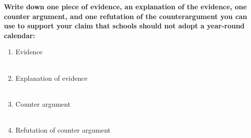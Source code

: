 \documentclass[12pt]{article}
\begin{document}
\begin{tcolorbox}[colframe=black!60, colback=white, 
coltitle=black, colbacktitle=black!15, fonttitle=\bfseries\Large, 
title=Guided Practice, halign title=center, left=10pt, right=10pt, top=10pt, bottom=15pt]
\textbf{Write down one piece of evidence, an explanation of the evidence, one counter argument, and one refutation of the counterargument you can use to support your claim that schools should not adopt a year-round calendar:}
\begin{enumerate}[itemsep=3em] %
    \item Evidence
    \\[0.8cm] \underline{\hspace{14.3cm}}  
    \\[0.8cm] \underline{\hspace{14.3cm}} 
    \item Explanation of evidence
     \\[0.8cm] \underline{\hspace{14.3cm}}  
    \\[0.8cm] \underline{\hspace{14.3cm}} 
    \item Counter argument
       \\[0.8cm] \underline{\hspace{14.3cm}}  
    \\[0.8cm] \underline{\hspace{14.3cm}} 
    \item     Refutation of counter argument
       \\[0.8cm] \underline{\hspace{14.3cm}}  
    \\[0.8cm] \underline{\hspace{14.3cm}} 

\vspace{1.5em}\end{enumerate}
\end{tcolorbox}

\vspace{2em}
\end{document}
